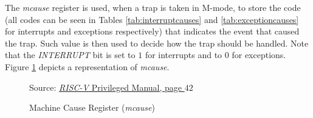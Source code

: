 The \textit{mcause} register is used, when a trap is taken in M-mode, to store
the code (all codes can be seen in Tables \ref{tab:interruptcauses} and \ref{tab:exceptioncauses}
for interrupts and exceptions respectively) that indicates the event that caused
the trap. Such value is then used to decide how the trap should be handled. Note
that the \textit{INTERRUPT} bit is set to $1$ for interrupts and to $0$ for exceptions.
Figure \ref{fig:mcause} depicts a representation of \textit{mcause}. \\
\begin{figure}[H]
  \centering
  \def\stackalignment{r} %
  {\scriptsize Source: \href{https://drive.google.com/file/d/17GeetSnT5wW3xNuAHI95-SI1gPGd5sJ_/view}{\textit{RISC-V} Privileged Manual, page $42$}}
  \caption{Machine Cause Register (\textit{mcause})}
  \label{fig:mcause}
\end{figure}

